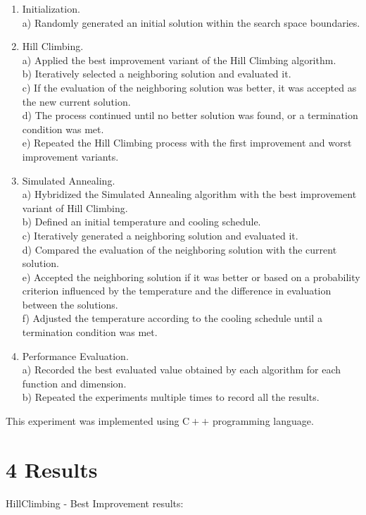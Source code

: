 \documentclass[10pt]{article}
\begin{document}
\begin{enumerate}
  \item Initialization.\\
a) Randomly generated an initial solution within the search space boundaries.
  \item Hill Climbing.\\
a) Applied the best improvement variant of the Hill Climbing algorithm.\\
b) Iteratively selected a neighboring solution and evaluated it.\\
c) If the evaluation of the neighboring solution was better, it was accepted as the new current solution.\\
d) The process continued until no better solution was found, or a termination condition was met.\\
e) Repeated the Hill Climbing process with the first improvement and worst improvement variants.
  \item Simulated Annealing.\\
a) Hybridized the Simulated Annealing algorithm with the best improvement variant of Hill Climbing.\\
b) Defined an initial temperature and cooling schedule.\\
c) Iteratively generated a neighboring solution and evaluated it.\\
d) Compared the evaluation of the neighboring solution with the current solution.\\
e) Accepted the neighboring solution if it was better or based on a probability criterion influenced by the temperature and the difference in evaluation between the solutions.\\
f) Adjusted the temperature according to the cooling schedule until a termination condition was met.
  \item Performance Evaluation.\\
a) Recorded the best evaluated value obtained by each algorithm for each function and dimension.\\
b) Repeated the experiments multiple times to record all the results.
\end{enumerate}

This experiment was implemented using $\mathrm{C}++$ programming language.

\section*{4 Results}
HillClimbing - Best Improvement results:
\end{document}
